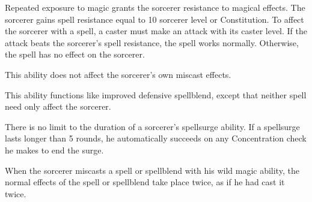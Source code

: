 Repeated exposure to magic grants the sorcerer resistance to magical effects.
The sorcerer gains spell resistance equal to 10 \add sorcerer level or Constitution.
To affect the sorcerer with a spell, a caster must make an attack with its caster level.
If the attack beats the sorcerer's spell resistance, the spell works normally.
Otherwise, the spell has no effect on the sorcerer.

This ability does not affect the sorcerer's own miscast effects.

This ability functions like improved defensive spellblend, except that neither spell need only affect the sorcerer.

There is no limit to the duration of a sorcerer's spellsurge ability.
If a spellsurge lasts longer than 5 rounds, he automatically succeeds on any Concentration check he makes to end the surge.

When the sorcerer miscasts a spell or spellblend with his wild magic ability, the normal effects of the spell or spellblend take place twice, as if he had cast it twice.

